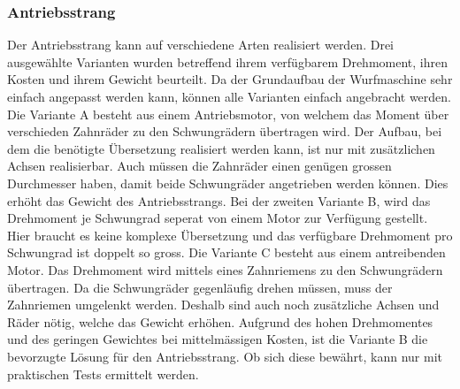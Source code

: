 \subsubsection{Antriebsstrang}
Der Antriebsstrang kann auf verschiedene Arten realisiert werden. Drei ausgewählte Varianten wurden
betreffend ihrem verfügbarem Drehmoment, ihren Kosten und ihrem Gewicht beurteilt. Da der Grundaufbau
der Wurfmaschine sehr einfach angepasst werden kann, können alle Varianten einfach angebracht werden.
Die Variante A besteht aus einem Antriebsmotor, von welchem das Moment über verschieden Zahnräder zu den
Schwungrädern übertragen wird. Der Aufbau, bei dem die benötigte Übersetzung realisiert werden kann, ist
nur mit zusätzlichen Achsen realisierbar. Auch müssen die Zahnräder einen genügen grossen Durchmesser
haben, damit beide Schwungräder angetrieben werden können. Dies erhöht das Gewicht des Antriebsstrangs. Bei der
zweiten Variante B, wird das Drehmoment je Schwungrad seperat von einem Motor zur Verfügung gestellt.
Hier braucht es keine komplexe Übersetzung und das verfügbare Drehmoment pro Schwungrad ist doppelt
so gross. Die Variante C besteht aus einem antreibenden Motor. Das Drehmoment wird mittels eines
Zahnriemens zu den Schwungrädern übertragen. Da die Schwungräder gegenläufig drehen müssen, muss der
Zahnriemen umgelenkt werden. Deshalb sind auch noch zusätzliche Achsen und Räder nötig, welche das
Gewicht erhöhen. Aufgrund des hohen Drehmomentes und des geringen Gewichtes bei mittelmässigen Kosten,
ist die Variante B die bevorzugte Lösung für den Antriebsstrang. Ob sich diese bewährt, kann nur mit
praktischen Tests ermittelt werden.
